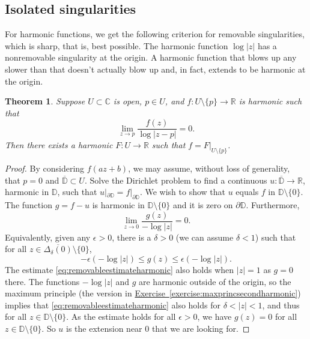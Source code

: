 \documentclass[12pt,openany]{book}
\newcommand{\sabs}[1]{\lvert {#1} \rvert}
\newcommand{\C}{{\mathbb{C}}}
\newcommand{\R}{{\mathbb{R}}}
\newcommand{\D}{{\mathbb{D}}}
\theoremstyle{plain}
\newtheorem{thm}{Theorem}[section]
\theoremstyle{remark}
\theoremstyle{definition}
\theoremstyle{exercise}
\theoremstyle{example}
\newcommand{\exerciseref}[1]{\hyperref[#1]{Exercise~\ref*{#1}}}
\begin{document}
\subsection{Isolated singularities}

For harmonic functions, we get the following criterion for removable
singularities, which is sharp, that is, best possible.
The harmonic function $\log \sabs{z}$
has a nonremovable singularity at the origin.
A harmonic function
that blows up any slower than that doesn't actually blow up and, in fact,
extends to be
harmonic at the origin.

\begin{thm}
Suppose $U \subset \C$ is open, $p \in U$, and $f \colon U \setminus \{ p \}
\to \R$ is harmonic such that
\begin{equation*}
\lim_{z\to p} \frac{f(z)}{\log \sabs{z-p}} = 0 .
\end{equation*}
Then there exists a harmonic $F \colon U \to \R$ such that
$f = F|_{U \setminus \{ p \}}$.
\end{thm}

\begin{proof}
By considering $f(a z + b)$, we may assume, without loss of generality,
that $p = 0$ and $\overline{\D} \subset U$.  Solve the Dirichlet problem
to find a continuous $u \colon \overline{\D} \to \R$,
harmonic in $\D$, such that $u|_{\partial \D} = f|_{\partial \D}$.
We wish to show that $u$ equals $f$ in $\D \setminus \{0\}$.
The function
$g = f - u$ is harmonic in $\D \setminus \{ 0 \}$ and it is zero on
$\partial \D$.  Furthermore,
\begin{equation*}
\lim_{z \to 0} \frac{g(z)}{-\log \sabs{z}} = 0.
\end{equation*}
Equivalently, given any $\epsilon > 0$, there is a $\delta > 0$
(we can assume $\delta < 1$)
such that for all $z \in \overline{\Delta_\delta(0)} \setminus \{ 0 \}$,
\begin{equation} \label{eq:removableestimateharmonic}
-\epsilon (- \log\sabs{z})
\leq
g(z)
\leq
\epsilon (- \log\sabs{z}) .
\end{equation}
The estimate \eqref{eq:removableestimateharmonic} also holds when
$\sabs{z}=1$ as $g=0$ there.
The functions $-\log\sabs{z}$ and $g$ are harmonic
outside of the origin, so
the maximum principle (the version in
\exerciseref{exercise:maxprincsecondharmonic}) implies that
\eqref{eq:removableestimateharmonic} also holds for $\delta < \sabs{z} < 1$,
and thus for all $z \in \D \setminus \{ 0 \}$.
As the estimate holds for all $\epsilon > 0$, we have $g(z) = 0$ for all
$z \in \D \setminus \{0\}$.  So $u$ is the extension near $0$ that
we are looking for.
\end{proof}
\end{document}
